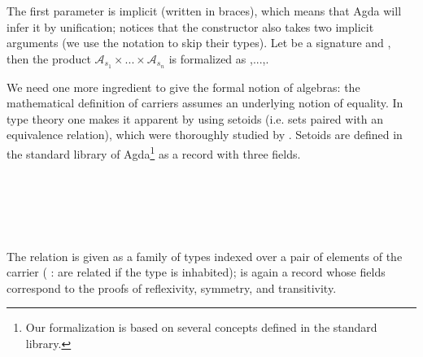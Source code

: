 \noindent The first parameter  is implicit (written in
braces), which means that Agda will infer it by unification; notices
that the constructor
 also
takes two implicit arguments (we use the notation  to
skip their types). Let  be a signature and
\AgdaSpace\AgdaSymbol{:}\AgdaSpace{}
  , then the product
$\mathcal{A}_{s_1} \times ... \times \mathcal{A}_{s_n}$ is formalized
as   \AgdaSymbol{[}
,...,\AgdaSymbol{]}.

We need one more ingredient to give the formal notion of algebras: the
mathematical definition of carriers assumes an underlying notion of
equality.  In type theory one makes it apparent by using setoids (i.e.
sets paired with an equivalence relation), which were thoroughly
studied by \cite{barthe-setoids-2003}. Setoids are
defined in the standard library \cite{danielsson-agdalib} of
Agda\footnote{Our formalization is based on several concepts defined
  in the standard library.} as a record with three
fields.

\begin{code}
\>[0]\AgdaSpace{}%
\AgdaSpace{}%
\AgdaSymbol{:}\AgdaSpace{}%
\AgdaSpace{}%
\<%
\\
\>[0][@{}l@{\AgdaIndent{0}}]%
\>[2]\<%
\\
\>[2][@{}l@{\AgdaIndent{0}}]%
\>[4]%
\>[18]\AgdaSymbol{:}\AgdaSpace{}%
\<%
\\
%
\>[4]%
\>[18]\AgdaSymbol{:}\AgdaSpace{}%
\AgdaSpace{}%
\AgdaSpace{}%
\AgdaSpace{}%
\AgdaSpace{}%
\<%
\\
%
\>[4]\AgdaSpace{}%
\AgdaSymbol{:}\AgdaSpace{}%
\AgdaSpace{}%
\<%
\end{code}


\noindent The relation is given as a family of types indexed over a pair
of elements of the carrier (  :  are related if the type
\AgdaSpace{}\AgdaSpace{} is inhabited); \AgdaSpace{}%
 is again a record whose fields
correspond to the proofs of reflexivity, symmetry, and transitivity.

